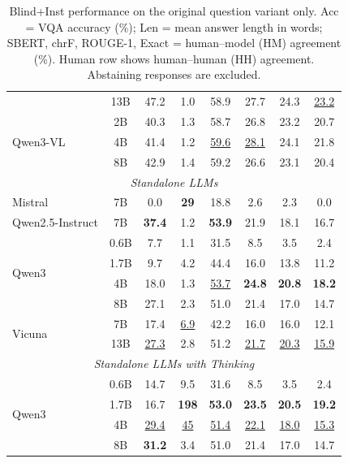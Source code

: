 \begin{table}[t]
{\begin{tabular}{lc|cccccc}
 & 13B & 47.2 & 1.0 & 58.9 & 27.7 & 24.3 & \underline{23.2} \\
\multirow{3}{*}{Qwen3-VL} & 2B & 40.3 & 1.3 & 58.7 & 26.8 & 23.2 & 20.7 \\
 & 4B & 41.4 & 1.2 & \underline{59.6} & \underline{28.1} & 24.1 & 21.8 \\
 & 8B & 42.9 & 1.4 & 59.2 & 26.6 & 23.1 & 20.4 \\
\midrule
\multicolumn{8}{c}{\textit{Standalone LLMs}} \\
\midrule
Mistral & 7B & 0.0 & \textbf{29} & 18.8 & 2.6 & 2.3 & 0.0 \\
Qwen2.5-Instruct & 7B & \textbf{37.4} & 1.2 & \textbf{53.9} & 21.9 & 18.1 & 16.7 \\
\multirow{4}{*}{Qwen3} & 0.6B & 7.7 & 1.1 & 31.5 & 8.5 & 3.5 & 2.4 \\
 & 1.7B & 9.7 & 4.2 & 44.4 & 16.0 & 13.8 & 11.2 \\
 & 4B & 18.0 & 1.3 & \underline{53.7} & \textbf{24.8} & \textbf{20.8} & \textbf{18.2} \\
 & 8B & 27.1 & 2.3 & 51.0 & 21.4 & 17.0 & 14.7 \\
\multirow{2}{*}{Vicuna} & 7B & 17.4 & \underline{6.9} & 42.2 & 16.0 & 16.0 & 12.1 \\
 & 13B & \underline{27.3} & 2.8 & 51.2 & \underline{21.7} & \underline{20.3} & \underline{15.9} \\
\midrule
\multicolumn{8}{c}{\textit{Standalone LLMs with Thinking}} \\
\midrule
\multirow{4}{*}{Qwen3} & 0.6B & 14.7 & 9.5 & 31.6 & 8.5 & 3.5 & 2.4 \\
 & 1.7B & 16.7 & \textbf{198} & \textbf{53.0} & \textbf{23.5} & \textbf{20.5} & \textbf{19.2} \\
 & 4B & \underline{29.4} & \underline{45} & \underline{51.4} & \underline{22.1} & \underline{18.0} & \underline{15.3} \\
 & 8B & \textbf{31.2} & 3.4 & 51.0 & 21.4 & 17.0 & 14.7 \\
\bottomrule
\end{tabular}
}
\caption{\small Blind+Inst performance on the original question variant only. Acc = VQA accuracy (\%); Len = mean answer length in words; SBERT, chrF, ROUGE-1, Exact = human--model (HM) agreement (\%). Human row shows human--human (HH) agreement. Abstaining responses are excluded.}
\label{tab:comprehensive_inst_blind_vc_filtered}
\end{table}
